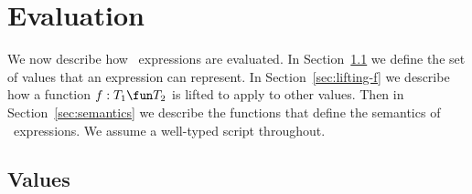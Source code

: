 \section{Evaluation}

We now describe how \CSPm\ expressions are evaluated.  In
Section~\ref{sec:values} we define the set of values that an expression can
represent.  In Section~\ref{sec:lifting-f} we describe how a function $f: T_1
\fun T_2$ is lifted to apply to other values.  Then in
Section~\ref{sec:semantics} we describe the functions that define the
semantics of \CSPm\ expressions.  
%
We assume a well-typed script throughout.


\subsection{Values}
\label{sec:values}

